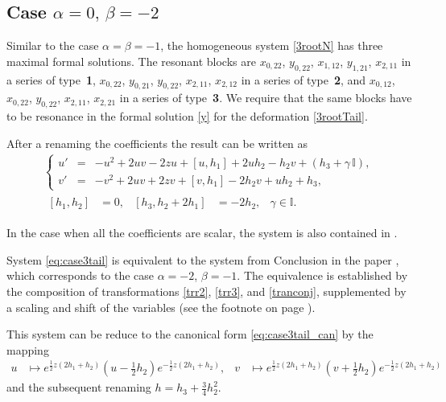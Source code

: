 \documentclass{article}
\theoremstyle{plain}
\newcommand{\brackets}[1]{\left( #1 \right)}
\newcommand{\LieBrackets}[1]{\left[ #1 \right]}
\begin{document}
\subsection{Case \texorpdfstring{$\alpha = 0,\, \beta =-2$}{alpha = 0, beta = -2}} \label{sec:case3_tail}

Similar to the case $\alpha = \beta = -1$, the homogeneous system \eqref{3rootN} has three maximal formal solutions. The resonant blocks are $x_{0, 22}$, $y_{0, 22}$, $x_{1, 12}$, $y_{1, 21}$, $x_{2,11}$ in a series of type~\textbf{1}, $x_{0, 22}$, $y_{0, 21}$, $y_{0, 22}$, $x_{2, 11}$, $x_{2, 12}$ in a series of type~\textbf{2}, and $x_{0, 12}$, $x_{0, 22}$, $y_{0, 22}$, $x_{2, 11}$, $x_{2, 21}$ in a series of type~\textbf{3}. We require that the same blocks have to be resonance in the formal solution \eqref{y} for the deformation \eqref{3rootTail}.

After a renaming the coefficients the result can be written as
\begin{equation}
    \begin{gathered}
    \label{eq:case3tail}
    \left\{
    \begin{array}{lcl}
    u'
    &=& - u^2 + 2 u v - 2 z u + \LieBrackets{u, h_1} + 2 u h_2 - h_2 v + \brackets{h_3 + \gamma \, \mathbb{I}},
    \\[2mm]
    v' 
    &=& - v^2 + 2 u v + 2 z v + \LieBrackets{v, h_1} - 2 h_2 v + u h_2 + h_3,
    \end{array}
    \right.
    \\[2mm]
    \begin{aligned}
    \LieBrackets{h_1, h_2}
    &= 0,
    &
    \LieBrackets{h_3, h_2 + 2 h_1}
    &= - 2 h_2,
    &
    \gamma \in \mathbb{I}.
    \end{aligned}
    \end{gathered}
\end{equation}

In the case when all the coefficients are scalar, the system is also contained in \cite[(19)]{adler2020}.

System \eqref{eq:case3tail} is equivalent to the system from Conclusion in the paper \cite{Adler_Sokolov_2020_1}, which corresponds to the case $\alpha = -2$, $\beta = -1$. The equivalence is established by the composition of transformations \eqref{trr2}, \eqref{trr3}, and \eqref{tranconj}, supplemented by a scaling  and shift of the variables (see the footnote on page \pageref{footnote:scal}).

This system can be reduce to the canonical form \ref{eq:case3tail_can} by the mapping
\begin{align*}
    u 
    & \mapsto e^{\frac12 z (2 h_1 + h_2)} 
    \brackets{u - \frac12 h_2} 
    e^{- \frac12 z (2 h_1 + h_2)},
    &
    v 
    & \mapsto e^{\frac12 z (2 h_1 + h_2)} 
    \brackets{v + \frac12 h_2} 
    e^{- \frac12 z (2 h_1 + h_2)}
\end{align*}
and the subsequent renaming $h = h_3 + \frac34 h_2^2$.
\end{document}
